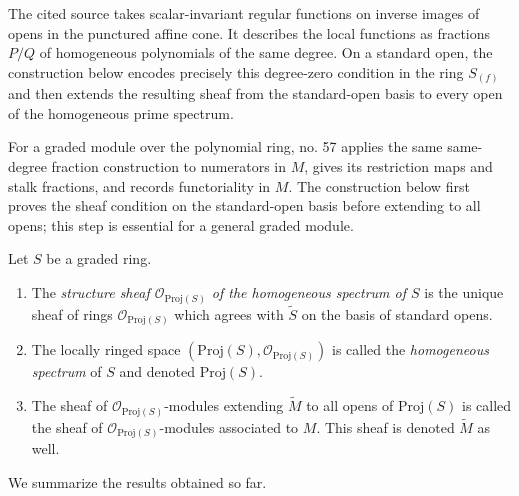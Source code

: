 \begin{definition}
\label{definition-structure-sheaf}
\begin{reference}
\cite[Chapter III, \S 1, no. 51, construction of the structure sheaf,
pp. 243--244]{FAC}
\cite[Chapter III, \S 2, no. 57, pp. 249--250]{FAC}
\end{reference}
\begin{history}
The cited source takes scalar-invariant regular functions on inverse images
of opens in the punctured affine cone. It describes the local functions as
fractions $P/Q$ of homogeneous polynomials of the same degree. On a standard
open, the construction below encodes precisely this degree-zero condition in
the ring $S_{(f)}$ and then extends the resulting sheaf from the standard-open
basis to every open of the homogeneous prime spectrum.

For a graded module over the polynomial ring, no. 57 applies the same
same-degree fraction construction to numerators in $M$, gives its restriction
maps and stalk fractions, and records functoriality in $M$. The construction
below first proves the sheaf condition on the standard-open basis before
extending to all opens; this step is essential for a general graded module.
\end{history}
Let $S$ be a graded ring.
\begin{enumerate}
\item The {\it structure sheaf $\mathcal{O}_{\text{Proj}(S)}$ of the
homogeneous spectrum of $S$} is the unique sheaf of rings
$\mathcal{O}_{\text{Proj}(S)}$
which agrees with $\widetilde S$ on the basis of standard opens.
\item The locally ringed space
$(\text{Proj}(S), \mathcal{O}_{\text{Proj}(S)})$ is called
the {\it homogeneous spectrum} of $S$ and denoted $\text{Proj}(S)$.
\item The sheaf of $\mathcal{O}_{\text{Proj}(S)}$-modules
extending $\widetilde M$ to all opens of $\text{Proj}(S)$
is called the sheaf of $\mathcal{O}_{\text{Proj}(S)}$-modules
associated to $M$. This sheaf is denoted $\widetilde M$ as
well.
\end{enumerate}
\end{definition}

\noindent
We summarize the results obtained so far.

